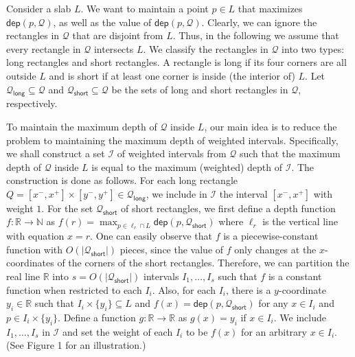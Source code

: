 Consider a slab $L$. We want to maintain a point $p\in L$ that maximizes $\mathsf{dep}(p,\mathcal{Q})$, as well as the value of $\mathsf{dep}(p,\mathcal{Q})$. Clearly, we can ignore the rectangles in $\mathcal{Q}$ that are disjoint from $L$. Thus, in the following we assume that every rectangle in $\mathcal{Q}$ intersects $L$. We classify the rectangles in $\mathcal{Q}$ into two types: long rectangles and short rectangles. A rectangle is long if its four corners are all outside $L$ and is short if at least one corner is inside (the interior of) $L$. Let $\mathcal{Q}_{\mathsf{long}}\subseteq\mathcal{Q}$ and $\mathcal{Q}_{\mathsf{short}}\subseteq\mathcal{Q}$ be the sets of long and short rectangles in $\mathcal{Q}$, respectively.
\par
\par
To maintain the maximum depth of $\mathcal{Q}$ inside $L$, our main idea is to reduce the problem to maintaining the maximum depth of weighted intervals. Specifically, we shall construct a set $\mathcal{I}$ of weighted intervals from $\mathcal{Q}$ such that the maximum depth of $\mathcal{Q}$ inside $L$ is equal to the maximum (weighted) depth of $\mathcal{I}$. The construction is done as follows. For each long rectangle $Q=[x^{-},x^{+}]\times[y^{-},y^{+}]\in\mathcal{Q}_{\mathsf{long}}$, we include in $\mathcal{I}$ the interval $[x^{-},x^{+}]$ with weight $1$. For the set $\mathcal{Q}_{\mathsf{short}}$ of short rectangles, we first define a depth function $f:\mathbb{R}\rightarrow\mathbb{N}$ as $f(r)=\max_{p\in\ell_{r}\cap L}\mathsf{dep}(p,\mathcal{Q}_{\mathsf{short}})$ where $\ell_{r}$ is the vertical line with equation $x=r$. One can easily observe that $f$ is a piecewise-constant function with $O(|\mathcal{Q}_{\mathsf{short}}|)$ pieces, since the value of $f$ only changes at the $x$-coordinates of the corners of the short rectangles. Therefore, we can partition the real line $\mathbb{R}$ into $s=O(|\mathcal{Q}_{\mathsf{short}}|)$ intervals $I_{1},\dots,I_{s}$ such that $f$ is a constant function when restricted to each $I_{i}$. Also, for each $I_{i}$, there is a $y$-coordinate $y_{i}\in\mathbb{R}$ such that $I_{i}\times\{y_{i}\}\subseteq L$ and $f(x)=\mathsf{dep}(p,\mathcal{Q}_{\mathsf{short}})$ for any $x\in I_{i}$ and $p\in I_{i}\times\{y_{i}\}$. Define a function $g:\mathbb{R}\rightarrow\mathbb{R}$ as $g(x)=y_{i}$ if $x\in I_{i}$. We include $I_{1},\dots,I_{s}$ in $\mathcal{I}$ and set the weight of each $I_{i}$ to be $f(x)$ for an arbitrary $x\in I_{i}$. (See Figure 1 for an illustration.)
